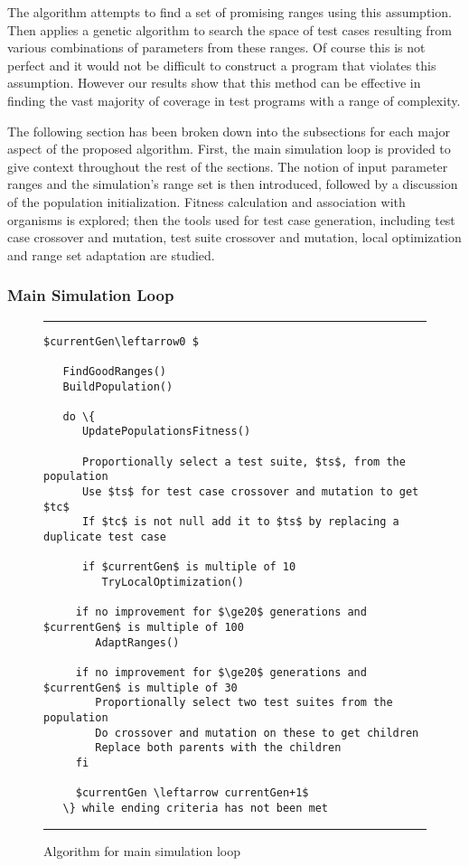 \documentclass[runningheads]{llncs}
\begin{document}
The algorithm attempts to find a set of promising ranges using this assumption. Then applies a genetic algorithm to search the space of test cases resulting from various combinations of parameters from these ranges. Of course this is not perfect and it would not be difficult to construct a program that violates this assumption. However our results show that this method can be effective in finding the vast majority of coverage in test programs with a range of complexity.

The following section has been broken down into the subsections for each major aspect of the proposed algorithm. First, the main simulation loop is provided to give context throughout the rest of the sections. The notion of input parameter ranges and the simulation's range set is then introduced, followed by a discussion of the population initialization. Fitness calculation and association with organisms is explored; then the tools used for test case generation, including test case crossover and mutation, test suite crossover and mutation, local optimization and range set adaptation are studied.

\subsubsection{Main Simulation Loop}

\begin{figure}[h!]
	\begin{center}
		\hrule
		\medskip
\begin{Verbatim}[fontfamily=tt, xleftmargin=10pt, commandchars=\\\{\},
codes={\catcode`$=3\catcode`^=7\catcode`_=8}]
   $currentGen\leftarrow0 $
   
   FindGoodRanges()
   BuildPopulation()
   
   do \{
      UpdatePopulationsFitness()
   
      Proportionally select a test suite, $ts$, from the population
      Use $ts$ for test case crossover and mutation to get $tc$
      If $tc$ is not null add it to $ts$ by replacing a duplicate test case
   
      if $currentGen$ is multiple of 10
         TryLocalOptimization()
   
     if no improvement for $\ge20$ generations and $currentGen$ is multiple of 100
        AdaptRanges()
   
     if no improvement for $\ge20$ generations and $currentGen$ is multiple of 30 
        Proportionally select two test suites from the population
        Do crossover and mutation on these to get children
        Replace both parents with the children
     fi
   
     $currentGen \leftarrow currentGen+1$
   \} while ending criteria has not been met
\end{Verbatim}
\hrule
	\end{center}
	\caption{Algorithm for main simulation loop \label{fig:simLoopAlt}}
\end{figure}
\FloatBarrier
\end{document}
